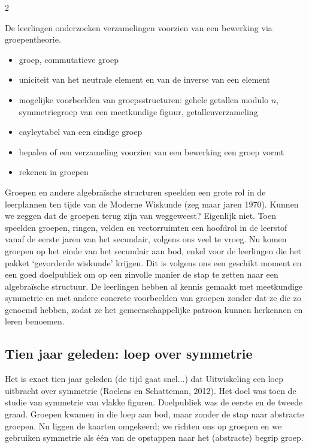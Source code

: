 \begin{multicols}{2}
	\begin{citaat}
	De leerlingen onderzoeken verzamelingen voorzien van een bewerking via groepentheorie.
    \begin{itemize}[noitemsep]
    \item groep, commutatieve groep
    \item uniciteit van het neutrale element en van de inverse van een element
    \item mogelijke voorbeelden van groepsstructuren: gehele getallen modulo $n$, symmetriegroep van een meetkundige figuur, getallenverzameling
    \item cayleytabel van een eindige groep
    \item bepalen of een verzameling voorzien van een bewerking een groep vormt
    \item rekenen in groepen
    \end{itemize}
	\end{citaat}
	
	Groepen en andere algebraïsche structuren speelden een grote rol in de leerplannen ten tijde van de Moderne Wiskunde (zeg maar jaren 1970). Kunnen we zeggen dat de groepen terug zijn van weggeweest? Eigenlijk niet. Toen speelden groepen, ringen, velden en vectorruimten een hoofdrol in de leerstof vanaf de eerste jaren van het secundair, volgens ons veel te vroeg. Nu komen groepen op het einde van het secundair aan bod, enkel voor de leerlingen die het pakket `gevorderde wiskunde' krijgen. Dit is volgens ons een geschikt moment en een goed doelpubliek om op een zinvolle manier de stap te zetten naar een algebraïsche structuur. De leerlingen hebben al kennis gemaakt met meetkundige symmetrie en met andere concrete voorbeelden van groepen zonder dat ze die zo genoemd hebben, zodat ze het gemeenschappelijke patroon kunnen herkennen en leren benoemen.
	
	\subsection*{Tien jaar geleden: loep over symmetrie}
	
	 Het is exact tien jaar geleden (de tijd gaat snel...) dat Uitwiskeling een loep uitbracht over symmetrie (Roelens en Schatteman, 2012). Het doel was toen de studie van symmetrie van vlakke figuren. Doelpubliek was de eerste en de tweede graad. Groepen kwamen in die loep aan bod, maar zonder de stap naar abstracte groepen. Nu liggen de kaarten omgekeerd: we richten ons op groepen en we gebruiken symmetrie als één van de opstappen naar het (abstracte) begrip groep. 
	 

\end{multicols}
